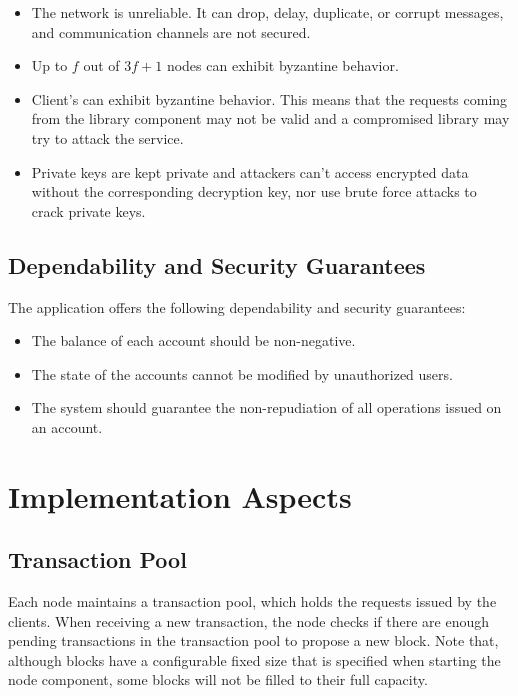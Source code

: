 \documentclass[letterpaper,twocolumn,10pt]{article}
\begin{document}
\begin{itemize}
    \item The network is unreliable. It can drop, delay, duplicate, or corrupt messages, and communication channels are not secured.
    \item Up to $f$ out of $3f + 1$ nodes can exhibit byzantine behavior.
    \item Client's can exhibit byzantine behavior. This means that the requests coming from the library component may not be valid and a compromised library may try to attack the service.
    \item Private keys are kept private and attackers can't access encrypted data without the corresponding decryption key, nor use brute force attacks to crack private keys.
\end{itemize}

\subsection{Dependability and Security Guarantees}
\label{dependability}

The application offers the following dependability and security guarantees:

\begin{itemize}
    \item The balance of each account should be non-negative.
    \item The state of the accounts cannot be modified by unauthorized users.
    \item The system should guarantee the non-repudiation of all operations issued on an account.
\end{itemize}

\section{Implementation Aspects}

\subsection{Transaction Pool}
\label{pool}

Each node maintains a transaction pool, which holds the requests issued by the clients. When receiving a new transaction, the node checks if there are enough pending transactions in the transaction pool to propose a new block. Note that, although blocks have a configurable fixed size that is specified when starting the node component, some blocks will not be filled to their full capacity.
\end{document}
